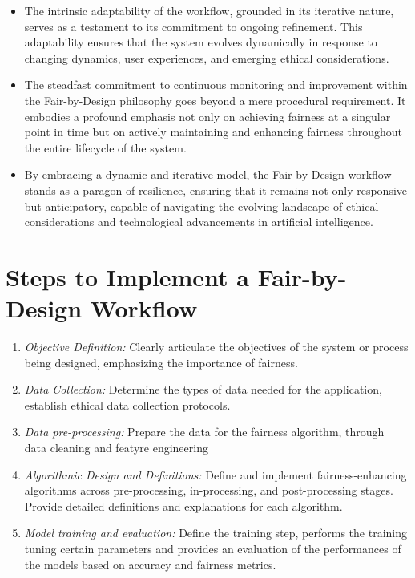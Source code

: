 \begin{enumerate}[label=\arabic*.]
\begin{itemize}
        \item The intrinsic adaptability of the workflow, grounded in its iterative nature, serves as a testament to its commitment to ongoing refinement. This adaptability ensures that the system evolves dynamically in response to changing dynamics, user experiences, and emerging ethical considerations.
    
        \item The steadfast commitment to continuous monitoring and improvement within the Fair-by-Design philosophy goes beyond a mere procedural requirement. It embodies a profound emphasis not only on achieving fairness at a singular point in time but on actively maintaining and enhancing fairness throughout the entire lifecycle of the system.
    
        \item By embracing a dynamic and iterative model, the Fair-by-Design workflow stands as a paragon of resilience, ensuring that it remains not only responsive but anticipatory, capable of navigating the evolving landscape of ethical considerations and technological advancements in artificial intelligence.
    
    \end{itemize}

\end{enumerate}

\section{Steps to Implement a Fair-by-Design Workflow}
\label{section:steps}

\begin{enumerate}

    \item \emph{Objective Definition:} Clearly articulate the objectives of the system or process being designed, emphasizing the importance of fairness.

    \item \emph{Data Collection:} Determine the types of data needed for the application, establish ethical data collection protocols.

    \item \emph{Data pre-processing:} Prepare the data for the fairness algorithm, through data cleaning and featyre engineering
    
    \item \emph{Algorithmic Design and Definitions:} Define and implement fairness-enhancing algorithms across pre-processing, in-processing, and post-processing stages. Provide detailed definitions and explanations for each algorithm.

    \item \emph{Model training and evaluation:} Define the training step, performs the training tuning certain parameters and provides an evaluation of the performances of the models based on accuracy and fairness metrics.

\end{enumerate}


